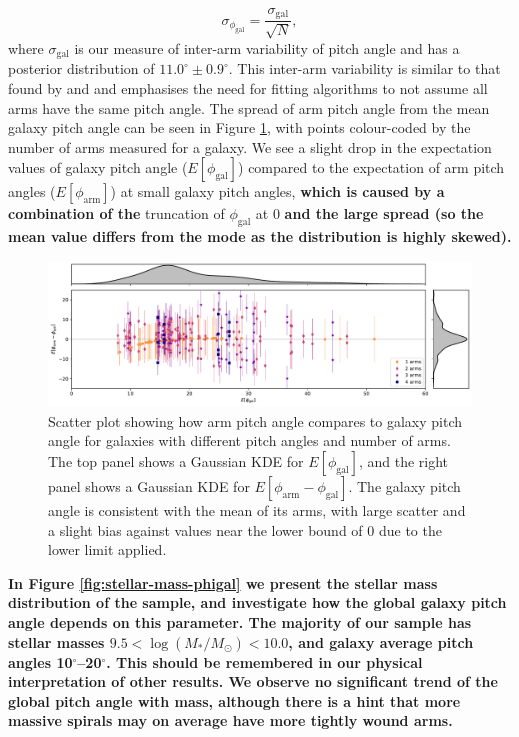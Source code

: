 \begin{equation}
  \sigma_{\phi_\mathrm{gal}} = \frac{\sigma_\mathrm{gal}}{\sqrt{N}},
\end{equation}
where $\sigma_\mathrm{gal}$ is our measure of inter-arm variability of pitch angle and has a posterior distribution of $11.0^\circ\pm 0.9^\circ$. This inter-arm variability is similar to that found by \citet{1981AJ.....86.1847K} and \citet{2014ApJ...790...87D} and emphasises the need for fitting algorithms to not assume all arms have the same pitch angle. The spread of arm pitch angle from the mean galaxy pitch angle can be seen in Figure \ref{fig:arm-pa-spread}, with points colour-coded by the number of arms measured for a galaxy. We see a slight drop in the expectation values of galaxy pitch angle ($E[\phi_\mathrm{gal}]$) compared to the expectation of arm pitch angles ($E[\phi_\mathrm{arm}]$) at small galaxy pitch angles, {\bf which is caused by a combination of the} truncation of $\phi_\mathrm{gal}$ at {0\degree} {\bf and the large spread (so the mean value differs from the mode as the distribution is highly skewed).}

\begin{figure}
  \includegraphics[width=17.7cm]{plots/arm_pa_spread.pdf}
  \caption{Scatter plot showing how arm pitch angle compares to galaxy pitch angle for galaxies with different pitch angles and number of arms. The top panel shows a Gaussian KDE for $E[\phi_\mathrm{gal}]$, and the right panel shows a Gaussian KDE for $E[\phi_\mathrm{arm} - \phi_\mathrm{gal}]$. The galaxy pitch angle is consistent with the mean of its arms, with large scatter and a slight bias against values near the lower bound of $0$ due to the lower limit applied.}
  \label{fig:arm-pa-spread}
\end{figure}

\textbf{In Figure \ref{fig:stellar-mass-phigal} we present the stellar mass distribution of the sample, and investigate how the global galaxy pitch angle depends on this parameter. The majority of our sample has stellar masses $9.5 < \log(M_* / M_\odot) < 10.0$, and galaxy average pitch angles 10$^\circ$--20$^\circ$. This should be remembered in our physical interpretation of other results. We observe no significant trend of the global pitch angle with mass, although there is a hint that more massive spirals may on average have more tightly wound arms. }

